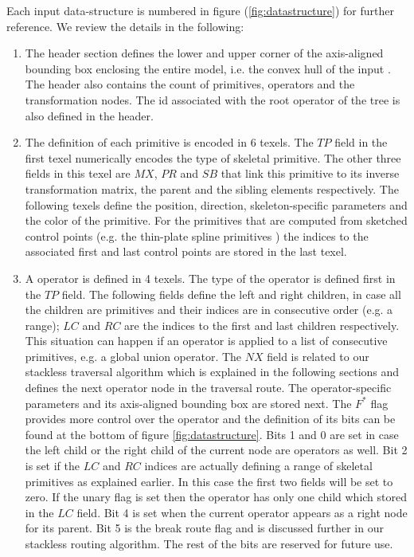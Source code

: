 Each input data-structure is numbered in figure (\ref{fig:datastructure}) for further reference. We review the details in the following:
\begin{enumerate}
 \item The header section defines the lower and upper corner of the axis-aligned bounding box enclosing the entire model, 
 i.e. the convex hull of the input \blob. The header also contains the count of primitives, operators and the transformation 
 nodes. The id associated with the root operator of the tree is also defined in the header.
 
 \item The definition of each primitive is encoded in 6 texels. The $TP$ field in the first texel numerically encodes the 
 type of skeletal primitive. The other three fields in this texel are $MX$, $PR$ and $SB$ that link this primitive to its inverse 
 transformation matrix, the parent and the sibling elements respectively. The following texels define the position, 
 direction, skeleton-specific parameters and the color of the primitive. For the primitives that are 
 computed from sketched control points (e.g. the thin-plate spline primitives \cite{Turk1999, Grasberger}) the indices to the 
 associated first and last control points are stored in the last texel.

 \item A \blob operator is defined in 4 texels. The type of the operator is defined first in the $TP$ field. 
 The following fields define the left and right children, in case all the children are primitives and their indices are in 
 consecutive order (e.g. a range); $LC$ and $RC$ are the indices to the first and last children respectively. This situation 
 can happen if an operator is applied to a list of consecutive primitives, e.g. a global union operator.  The $NX$ 
 field is related to our stackless \blob traversal algorithm which is explained in the following sections and defines the next 
 operator node in the \blob traversal route. The operator-specific parameters and its axis-aligned bounding box are stored next. 
 The $F^*$ flag provides more control over the operator and the definition of its bits can be found at the bottom of figure
 \ref{fig:datastructure}. Bits 1 and 0 are set in case the left child or the right child of the current node are operators as well. Bit 2 is 
 set if the $LC$ and $RC$ indices are actually defining a range of skeletal primitives as explained earlier. In this case the 
 first two fields will be set to zero. If the unary flag is set then the operator has only one child which stored in the $LC$ field.  
 Bit 4 is set when the current operator appears as a right node for its parent. Bit 5 is the break route flag and is discussed further 
 in our stackless \blob routing algorithm. The rest of the bits are reserved for future use. 
 

\end{enumerate}
